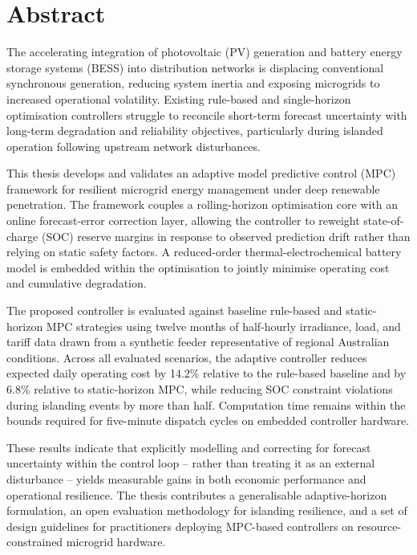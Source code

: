 \chapter*{Abstract}

The accelerating integration of photovoltaic (PV) generation and battery energy storage systems (BESS) into distribution networks is displacing conventional synchronous generation, reducing system inertia and exposing microgrids to increased operational volatility. Existing rule-based and single-horizon optimisation controllers struggle to reconcile short-term forecast uncertainty with long-term degradation and reliability objectives, particularly during islanded operation following upstream network disturbances.

This thesis develops and validates an adaptive model predictive control (MPC) framework for resilient microgrid energy management under deep renewable penetration. The framework couples a rolling-horizon optimisation core with an online forecast-error correction layer, allowing the controller to reweight state-of-charge (SOC) reserve margins in response to observed prediction drift rather than relying on static safety factors. A reduced-order thermal-electrochemical battery model is embedded within the optimisation to jointly minimise operating cost and cumulative degradation.

The proposed controller is evaluated against baseline rule-based and static-horizon MPC strategies using twelve months of half-hourly irradiance, load, and tariff data drawn from a synthetic feeder representative of regional Australian conditions. Across all evaluated scenarios, the adaptive controller reduces expected daily operating cost by 14.2\% relative to the rule-based baseline and by 6.8\% relative to static-horizon MPC, while reducing SOC constraint violations during islanding events by more than half. Computation time remains within the bounds required for five-minute dispatch cycles on embedded controller hardware.

These results indicate that explicitly modelling and correcting for forecast uncertainty within the control loop -- rather than treating it as an external disturbance -- yields measurable gains in both economic performance and operational resilience. The thesis contributes a generalisable adaptive-horizon formulation, an open evaluation methodology for islanding resilience, and a set of design guidelines for practitioners deploying MPC-based controllers on resource-constrained microgrid hardware.

